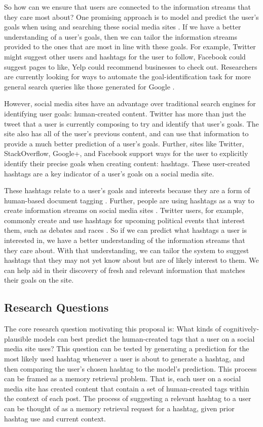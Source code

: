 \documentclass[man,floatsintext,donotrepeattitle]{apa6}
\begin{document}
So how can we ensure that users are connected to the information streams that they care most about?
One promising approach is to model and predict the user's goals when using and searching these social media sites \parencite{Rose2004}.
If we have a better understanding of a user's goals, then we can tailor the information streams provided to the ones that are most in line with these goals.
For example, Twitter might suggest other users and hashtags for the user to follow, Facebook could suggest pages to like, Yelp could recommend businesses to check out.
Researchers are currently looking for ways to automate the goal-identification task for more general search queries like those generated for Google \parencites{Jansen2008}{Lee2005}.

However, social media sites have an advantage over traditional search engines for identifying user goals: human-created content.
Twitter has more than just the tweet that a user is currently composing to try and identify that user's goals.
The site also has all of the user's previous content, and can use that information to provide a much better prediction of a user's goals.
Further, sites like Twitter, StackOverflow, Google+, and Facebook support ways for the user to explicitly identify their precise goals when creating content: hashtags.
These user-created hashtags are a key indicator of a user's goals on a social media site. 

These hashtags relate to a user's goals and interests because they are a form of human-based document tagging \parencite{Chang2010}.
Further, people are using hashtags as a way to create information streams on social media sites \parencite{Kwak2010}.
Twitter users, for example, commonly create and use hashtags for upcoming political events that interest them, such as debates and races \parencite{Diakopoulos2010}.
So if we can predict what hashtags a user is interested in, we have a better understanding of the information streams that they care about.
With that understanding, we can tailor the system to suggest hashtags that they may not yet know about but are of likely interest to them.
We can help aid in their discovery of fresh and relevant information that matches their goals on the site.

\subsection{Research Questions}

The core research question motivating this proposal is:
What kinds of cognitively-plausible models can best predict the human-created tags that a user on a social media site uses?
This question can be tested by generating a prediction for the most likely used hashtag whenever a user is about to generate a hashtag, and then comparing the user's chosen hashtag to the model's prediction.
This process can be framed as a memory retrieval problem.
That is, each user on a social media site has created content that contain a set of human-created tags within the context of each post.
The process of suggesting a relevant hashtag to a user can be thought of as a memory retrieval request for a hashtag, given prior hashtag use and current context.
\end{document}
